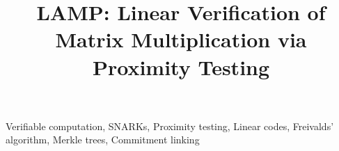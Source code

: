 \documentclass[conference,compsoc]{IEEEtran}
\begin{document}
\title{LAMP: Linear Verification of Matrix Multiplication via Proximity Testing}

\author{}

\maketitle

\begin{abstract}

\end{abstract}

\begin{IEEEkeywords}
Verifiable computation, SNARKs, Proximity testing, Linear codes, Freivalds' algorithm, Merkle trees, Commitment linking
\end{IEEEkeywords}




















\appendices

\end{document}
